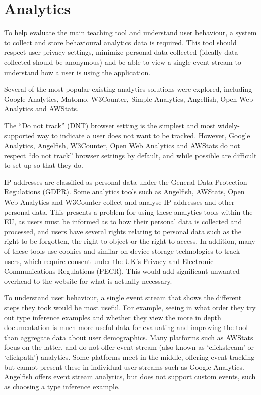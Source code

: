 \documentclass[a4paper,fleqn,oneside,12pt]{report}
\begin{document}
\section{Analytics}\label{id:h.60njhv340fb0}
To help evaluate the main teaching tool and understand user behaviour, a system to collect and store behavioural analytics data is required. This tool should respect user privacy settings, minimize personal data collected (ideally data collected should be anonymous) and be able to view a single event stream to understand how a user is using the application.

Several of the most popular existing analytics solutions were explored, including Google Analytics, Matomo, W3Counter, Simple Analytics, Angelfish, Open Web Analytics and AWStats.

The “Do not track” (DNT) browser setting is the simplest and most widely-supported way to indicate a user does not want to be tracked. However, Google Analytics, Angelfish, W3Counter, Open Web Analytics and AWStats do not respect “do not track” browser settings by default, and while possible are difficult to set up so that they do.

IP addresses are classified as personal data under the General Data Protection Regulations (GDPR). Some analytics tools such as Angelfish, AWStats, Open Web Analytics and W3Counter collect and analyse IP addresses and other personal data. This presents a problem for using these analytics tools within the EU, as users must be informed as to how their personal data is collected and processed, and users have several rights relating to personal data such as the right to be forgotten, the right to object or the right to access. In addition, many of these tools use cookies and similar on-device storage technologies to track users, which require consent under the UK’s Privacy and Electronic Communications Regulations (PECR). This would add significant unwanted overhead to the website for what is actually necessary.

To understand user behaviour, a single event stream that shows the different steps they took would be most useful. For example, seeing in what order they try out type inference examples and whether they view the more in depth documentation is much more useful data for evaluating and improving the tool than aggregate data about user demographics. Many platforms such as AWStats focus on the latter, and do not offer event stream (also known as ‘clickstream’ or ‘clickpath’) analytics. Some platforms meet in the middle, offering event tracking but cannot present these in individual user streams such as Google Analytics. Angelfish offers event stream analytics, but does not support custom events, such as choosing a type inference example.
\end{document}
